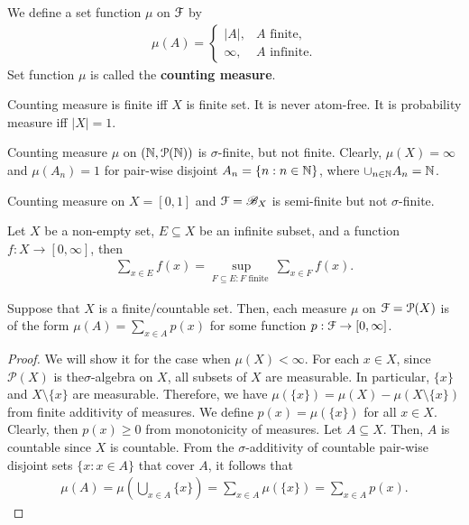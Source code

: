 \documentclass[a4paper,english,12pt]{article}
\begin{document}
\begin{defn} We define a set function $\mu$ on $\mathcal{F}$ by 
\begin{align*}
\mu(A) = \begin{cases}|A|, & A \text{ finite},\\ \infty, &A \text{ infinite}.\end{cases}
\end{align*} 
Set function $\mu$ is called the \textbf{counting measure}. 
\end{defn}
\begin{lem} Counting measure is finite iff $X$ is finite set. It is never atom-free. It is probability measure iff $|X| = 1$.
\end{lem}

\begin{exmp} Counting measure $\mu$ on $(\mathbb{N}, \mathcal{P}(\mathbb{N}))$ is $\sigma$-finite, but not finite. Clearly, $\mu(X) = \infty$ and $\mu(A_n) = 1$ for pair-wise disjoint $A_n = \{n: n \in \mathbb{N}\}$, where $\cup_{n \in \mathbb{N}}A_n = \mathbb{N}$.
\end{exmp}

\begin{exmp} Counting measure on $X = [0,1]$ and $\mathcal{F} = \mathscr{B}_X$ is semi-finite but not $\sigma$-finite.
\end{exmp}

\begin{defn} Let $X$ be a non-empty set, $E \subseteq X$ be an infinite subset, and a function $f: X \to [0, \infty]$, then 
\begin{align*}
\sum_{x \in E} f(x) = \sup_{F \subseteq E:  F \text{ finite }}\sum_{x \in F}f(x).
\end{align*}
\end{defn}

\begin{prop}
Suppose that $X$ is a finite/countable set. Then, each measure $\mu$ on $\mathcal{F} = \mathcal{P}(X)$ is of the form $\mu(A) = \sum_{x \in A}p(x)$ for some function $p: \mathcal{F} \to [0, \infty]$. 
\end{prop}
\begin{proof} We will show it for the case when $\mu(X) < \infty$. For each $x \in X$, since $\mathcal{P}(X)$ is the$\sigma$-algebra on $X$, all subsets of $X$ are measurable. In particular, $\{x\}$ and $X \setminus \{x\}$ are measurable. Therefore, we have $\mu(\{x\}) = \mu(X) - \mu(X\setminus \{x\})$ from finite additivity of measures. We define $p(x) = \mu(\{x\})$ for all $x \in X$. Clearly, then $p(x) \geq  0$ from monotonicity of measures. Let $A \subseteq X$. Then, $A$ is countable since $X$ is countable. From the $\sigma$-additivity of countable pair-wise disjoint sets $\{x: x \in A\}$ that cover $A$, it follows that
\begin{align*}
\mu(A) = \mu(\bigcup_{x \in A}\{x\}) = \sum_{x \in A}\mu(\{x\}) = \sum_{x \in A}p(x).
\end{align*}
\end{proof}
\end{document}
